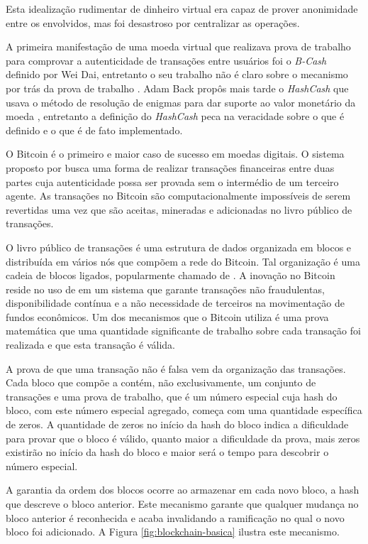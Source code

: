 \documentclass[tcc,capa]{texufpel}
\begin{document}
	Esta idealização rudimentar de dinheiro virtual era capaz de prover anonimidade entre os envolvidos, mas foi desastroso por centralizar as operações.
	
	A primeira manifestação de uma moeda virtual que realizava prova de trabalho para comprovar a autenticidade de transações entre usuários foi o \textit{B-Cash} definido por Wei Dai, entretanto o seu trabalho não é claro sobre o mecanismo por trás da prova de trabalho \cite{buterin2014next}. Adam Back propôs mais tarde o \textit{HashCash} que usava o método de resolução de enigmas para dar suporte ao valor monetário da moeda \cite{back2002hashcash}, entretanto a definição do \textit{HashCash} peca na veracidade sobre o que é definido e o que é de fato implementado.
	
	O Bitcoin é o primeiro e maior caso de sucesso em moedas digitais. O sistema proposto por \cite{nakamoto2008bitcoin} busca uma forma de realizar transações financeiras entre duas partes cuja autenticidade possa ser provada sem o intermédio de um terceiro agente. As transações no Bitcoin são computacionalmente impossíveis de serem revertidas uma vez que são aceitas, mineradas e adicionadas no livro público de transações.
	
	O livro público de transações é uma estrutura de dados organizada em blocos e distribuída em vários nós que compõem a rede do Bitcoin. Tal organização é uma cadeia de blocos ligados, popularmente chamado de \bchain. A inovação no Bitcoin reside no uso de \bchain em um sistema que garante transações não fraudulentas, disponibilidade contínua e a não necessidade de terceiros na movimentação de fundos econômicos. Um dos mecanismos que o Bitcoin utiliza é uma prova matemática que uma quantidade significante de trabalho sobre cada transação foi realizada e que esta transação é válida. 
	
	A prova de que uma transação não é falsa vem da organização das transações. Cada bloco que compõe a \bchain contém, não exclusivamente, um conjunto de transações e uma prova de trabalho, que é um número especial cuja hash do bloco, com este número especial agregado, começa com uma quantidade específica de zeros. A quantidade de zeros no início da hash do bloco indica a dificuldade para provar que o bloco é válido, quanto maior a dificuldade da prova, mais zeros existirão no início da hash do bloco e maior será o tempo para descobrir o número especial.
	
	A garantia da ordem dos blocos ocorre ao armazenar em cada novo bloco, a hash que descreve o bloco anterior. Este mecanismo garante que qualquer mudança no bloco anterior é reconhecida e acaba invalidando a ramificação no qual o novo bloco foi adicionado. A Figura \ref{fig:blockchain-basica} ilustra este mecanismo.
	
\end{document}
